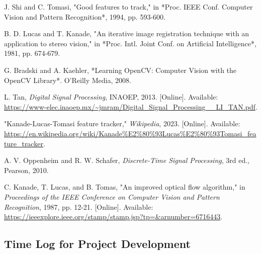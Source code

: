 \documentclass[11pt, conference, letterpaper]{IEEEtran}
\begin{document}
\begin{thebibliography}{1}

    J. Shi and C. Tomasi, "Good features to track," in *Proc. IEEE Conf. Computer Vision and Pattern Recognition*, 1994, pp. 593-600.
    
    B. D. Lucas and T. Kanade, "An iterative image registration technique with an application to stereo vision," in *Proc. Intl. Joint Conf. on Artificial Intelligence*, 1981, pp. 674-679.
    
    G. Bradski and A. Kaehler, *Learning OpenCV: Computer Vision with the OpenCV Library*. O'Reilly Media, 2008.
    
    L. Tan, \textit{Digital Signal Processing}, INAOEP, 2013. [Online]. Available: \url{https://www-elec.inaoep.mx/~jmram/Digital_Signal_Processing__LI_TAN.pdf}.
    
    "Kanade-Lucas-Tomasi feature tracker," \textit{Wikipedia}, 2023. [Online]. Available: \url{https://en.wikipedia.org/wiki/Kanade%E2%80%93Lucas%E2%80%93Tomasi_feature_tracker}.
    
    A. V. Oppenheim and R. W. Schafer, \textit{Discrete-Time Signal Processing}, 3rd ed., Pearson, 2010.
    
    C. Kanade, T. Lucas, and B. Tomas, "An improved optical flow algorithm," in \textit{Proceedings of the IEEE Conference on Computer Vision and Pattern Recognition}, 1987, pp. 12-21. [Online]. Available: \url{https://ieeexplore.ieee.org/stamp/stamp.jsp?tp=&arnumber=6716443}.
    
\end{thebibliography}


\newpage

\onecolumn
\appendix
\subsection{Time Log for Project Development}
\end{document}

